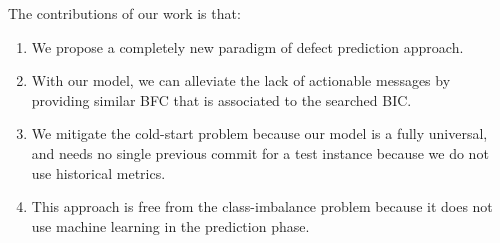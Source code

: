 \vspace{3mm}
The contributions of our work is that:
\begin{enumerate}
    \item We propose a completely new paradigm of defect prediction approach.
    \item With our model, we can alleviate the lack of actionable messages by providing similar BFC that is associated to the searched BIC.
    \item We mitigate the cold-start problem because our model is a fully universal, and needs no single previous commit for a test instance because we do not use historical metrics.
    \item This approach is free from the class-imbalance problem because it does not use machine learning in the prediction phase.
\end{enumerate}


